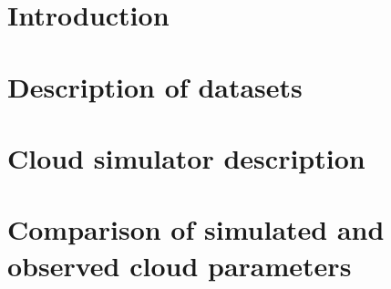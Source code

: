 \documentclass[a4paper,11pt]{article}
\begin{document}
\title{\doctitle}
\author{\docauthor}
\date{\today}
\maketitle
\tableofcontents


\section{Introduction}\label{sec:intro}


\section{Description of datasets}\label{sec:datasets}


\section{Cloud simulator description}\label{sec:sim}
% 


\section{Comparison of simulated and observed cloud parameters}\label{sec:sim_vs_obs}
%
%
%
%
%
%

\newpage
{}

%
 
\end{document}
